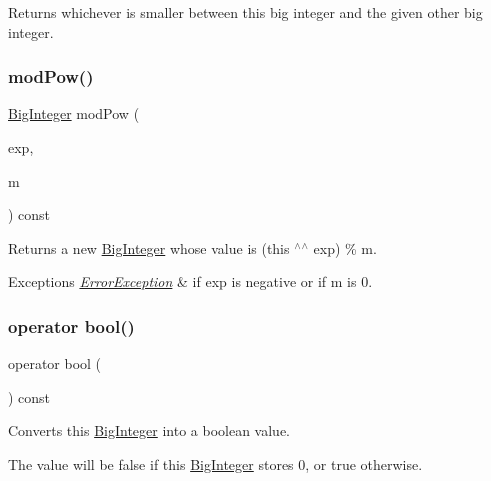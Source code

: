 Returns whichever is smaller between this big integer and the given other big integer. 

\mbox{\label{classBigInteger_a0784fc13afdca5e439e2cb99dc2b1055}} 
\subsubsection{\texorpdfstring{mod\+Pow()}{modPow()}}
{\footnotesize\ttfamily \mbox{\hyperlink{classBigInteger}{Big\+Integer}} mod\+Pow (\begin{DoxyParamCaption}\item[{const \mbox{\hyperlink{classBigInteger}{Big\+Integer}} \&}]{exp,  }\item[{const \mbox{\hyperlink{classBigInteger}{Big\+Integer}} \&}]{m }\end{DoxyParamCaption}) const}



Returns a new \mbox{\hyperlink{classBigInteger}{Big\+Integer}} whose value is (this $^\wedge$$^\wedge$ exp) \% m. 


\begin{DoxyExceptions}{Exceptions}
{\em \mbox{\hyperlink{classErrorException}{Error\+Exception}}} & if exp is negative or if m is 0. \\
\hline
\end{DoxyExceptions}
\mbox{\label{classBigInteger_a67b76affb3b5d35fa419ac234144038b}} 
\subsubsection{\texorpdfstring{operator bool()}{operator bool()}}
{\footnotesize\ttfamily operator bool (\begin{DoxyParamCaption}{ }\end{DoxyParamCaption}) const\hspace{0.3cm}{\ttfamily [explicit]}}



Converts this \mbox{\hyperlink{classBigInteger}{Big\+Integer}} into a boolean value. 

The value will be false if this \mbox{\hyperlink{classBigInteger}{Big\+Integer}} stores 0, or true otherwise. \mbox{\label{classBigInteger_a48d27bd92e68c69527589ea65a9af69f}} 
